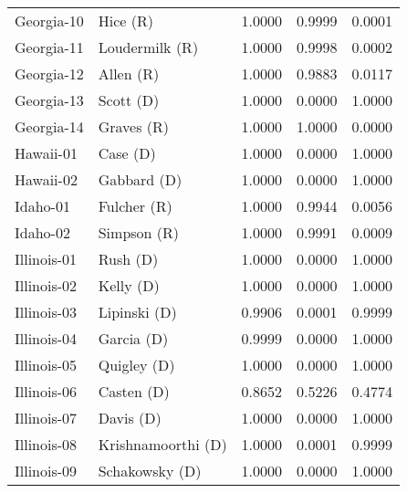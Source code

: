 \begin{longtable}{llrll}
        Georgia-10 &             {\color{Red} Hice (R)} &       1.0000 &        0.9999 &        0.0001 \\
        Georgia-11 &       {\color{Red} Loudermilk (R)} &       1.0000 &        0.9998 &        0.0002 \\
        Georgia-12 &            {\color{Red} Allen (R)} &       1.0000 &        0.9883 &        0.0117 \\
        Georgia-13 &           {\color{Blue} Scott (D)} &       1.0000 &        0.0000 &        1.0000 \\
        Georgia-14 &           {\color{Red} Graves (R)} &       1.0000 &        1.0000 &        0.0000 \\
         Hawaii-01 &            {\color{Blue} Case (D)} &       1.0000 &        0.0000 &        1.0000 \\
         Hawaii-02 &         {\color{Blue} Gabbard (D)} &       1.0000 &        0.0000 &        1.0000 \\
          Idaho-01 &          {\color{Red} Fulcher (R)} &       1.0000 &        0.9944 &        0.0056 \\
          Idaho-02 &          {\color{Red} Simpson (R)} &       1.0000 &        0.9991 &        0.0009 \\
       Illinois-01 &            {\color{Blue} Rush (D)} &       1.0000 &        0.0000 &        1.0000 \\
       Illinois-02 &           {\color{Blue} Kelly (D)} &       1.0000 &        0.0000 &        1.0000 \\
       Illinois-03 &        {\color{Blue} Lipinski (D)} &       0.9906 &        0.0001 &        0.9999 \\
       Illinois-04 &          {\color{Blue} Garcia (D)} &       0.9999 &        0.0000 &        1.0000 \\
       Illinois-05 &         {\color{Blue} Quigley (D)} &       1.0000 &        0.0000 &        1.0000 \\
       Illinois-06 &          {\color{Blue} Casten (D)} &       0.8652 &        0.5226 &        0.4774 \\
       Illinois-07 &           {\color{Blue} Davis (D)} &       1.0000 &        0.0000 &        1.0000 \\
       Illinois-08 &  {\color{Blue} Krishnamoorthi (D)} &       1.0000 &        0.0001 &        0.9999 \\
       Illinois-09 &      {\color{Blue} Schakowsky (D)} &       1.0000 &        0.0000 &        1.0000 \\

\end{longtable}
